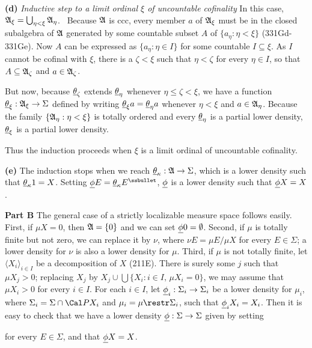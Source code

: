 {\medskip


{\bf (d)} {\it Inductive step to a limit ordinal $\xi$ of uncountable
cofinality} In this case,
$\frak A_{\xi}=\bigcup_{\eta<\xi}\frak A_{\eta}$.
\Prf\ Because $\frak A$ is ccc, every member $a$ of
$\frak A_{\xi}$ must be in the closed subalgebra of $\frak A$ generated
by some countable subset $A$ of $\{a_{\eta}:\eta<\xi\}$ (331Gd-331Ge).
Now $A$ can be expressed as $\{a_{\eta}:\eta\in I\}$ for some countable
$I\subseteq\xi$.   As $I$ cannot be cofinal with $\xi$, there is a
$\zeta<\xi$ such that $\eta<\zeta$ for every $\eta\in I$, so that
$A\subseteq\frak A_{\zeta}$ and $a\in\frak A_{\zeta}$.\ \Qed

But now, because $\underline{\theta}_{\zeta}$ extends
$\underline{\theta}_{\eta}$ whenever $\eta\le\zeta<\xi$, we have a
function $\underline{\theta}_{\xi}:\frak A_{\xi}\to\Sigma$ defined by
writing $\underline{\theta}_{\xi}a=\underline{\theta}_{\eta}a$ whenever
$\eta<\xi$ and $a\in\frak A_{\eta}$.   Because the family $\{\frak
A_{\eta}:\eta<\xi\}$ is totally ordered and every
$\underline{\theta}_{\eta}$ is a partial lower density,
$\underline{\theta}_{\xi}$ is a partial lower density.

Thus the induction proceeds when $\xi$ is a limit ordinal of uncountable
cofinality.

\medskip

{\bf (e)} The induction stops when we reach
$\underline{\theta}_{\kappa}:\frak A\to\Sigma$, which is a lower
density such that $\underline{\theta}_{\kappa}1=X$.   Setting
$\undphi E=\undtheta_{\kappa}E^{\ssbullet}$,
${\underline{\phi}}$ is a lower density such that ${\underline{\phi}} X=X$.

\medskip

{\bf Part B} The general case of a strictly localizable
measure space
follows easily.   First, if $\mu X=0$, then $\frak A=\{0\}$ and we
can set ${\underline{\phi}} 0=\emptyset$.   Second, if $\mu$ is totally finite
but not zero, we can replace it by $\nu$, where $\nu E=\mu
E/\mu X$ for every $E\in\Sigma$;  a lower density for $\nu$ is
also a lower density for $\mu$.   Third, if $\mu$ is not totally finite,
let $\langle X_i\rangle_{i\in I}$ be a decomposition of $X$ (211E).
There is surely some $j$ such that $\mu X_j>0$;  replacing $X_j$ by
$X_j\cup\bigcup\{X_i:i\in I,\,\mu X_i=0\}$, we may assume that $\mu
X_i>0$ for every $i\in I$.   For each
$i\in I$, let ${\underline{\phi}}_i:\Sigma_i\to\Sigma_i$ be a
lower density for $\mu_i$, where $\Sigma_i=\Sigma\cap\Cal PX_i$ and
$\mu_i=\mu\restr\Sigma_i$, such that ${\underline{\phi}}_iX_i=X_i$.   Then it is
easy to check that we
have a lower density ${\underline{\phi}}:\Sigma\to\Sigma$ given by setting


\noindent for every $E\in\Sigma$, and that ${\underline{\phi}} X=X$.
}%

